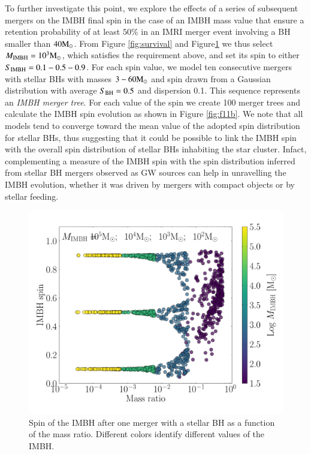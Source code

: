\documentclass[article]{aa}
\newcommand{\Ms}{{\rm M}_\odot}
\newcommand{\ibh}{{\rm IMBH}}
\newcommand{\bh}{{\rm BH}}
\begin{document}
{To further investigate this point, we explore the effects of a series of subsequent mergers on the IMBH final spin in the case of 
an IMBH mass value  that ensure a retention probability of at least $50\%$ in an IMRI merger event involving a BH smaller than $40\Ms$.
From Figure \ref{fig:survival} and Figure\ref{fig:f11a} we thus select $M_\ibh = 10^3\Ms$, which satisfies the requirement above, and set its spin to either $S_\ibh = 0.1-0.5-0.9$. For each spin value, we model ten consecutive mergers with stellar BHs with masses $3-60\Ms$ and spin drawn from a Gaussian distribution with average $S_\bh = 0.5$ and dispersion 0.1. This sequence represents an {\it IMBH merger tree}. For each value of the spin we create 100 merger trees and calculate the IMBH spin evolution as shown in Figure \ref{fig:f11b}.
We note that all models tend to converge toward the mean value of the adopted spin distribution for stellar BHs, thus suggesting that it could be possible to link the IMBH spin with the overall spin distribution of stellar BHs inhabiting the star cluster. Infact, complementing a measure of the IMBH spin with the spin distribution inferred from stellar BH mergers observed as GW sources can help in unravelling the IMBH evolution, whether it was driven by mergers with compact objects or by stellar feeding.
}

\begin{figure}
\centering
\includegraphics[width=\columnwidth]{track}
\caption{Spin of the IMBH after one merger with a stellar BH as a function of the mass ratio. Different colors identify different values of the IMBH.}
\label{fig:f11a}
\end{figure}
\end{document}
